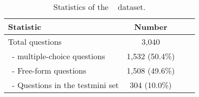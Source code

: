 \begin{table}[t]
    \small
    \centering
    \begin{adjustbox}{max width=0.47\textwidth}
    {
    \begin{tabular}{lccc}
        \toprule
        
       \textbf{Statistic} & \textbf{Number} \\
         \midrule
          Total questions & 3,040 \\
          ~- multiple-choice questions & 1,532 (50.4\%) \\
          ~- Free-form questions & 1,508 (49.6\%) \\
          ~- Questions in the testmini set & 304 (10.0\%) \\
        \bottomrule
    \end{tabular}
    }
    \end{adjustbox}
    \caption{Statistics of the \mathv~ dataset. } 
    \label{tab:dataset_stats_mathv}
    
\end{table}
